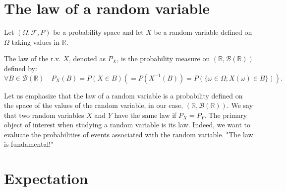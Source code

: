 \section{The law of a random variable}%
Let $(\Omega, \mathcal{F}, P)$ be a probability space and let $X$ be a random variable defined on $\Omega$ taking values in $\mathbb{R}$.%

\begin{definition}
The law of the r.v. $X$, denoted as $P_X$, is the probability measure on $(\mathbb{R}, \mathcal{B}(\mathbb{R}))$ defined by:
\[ \forall B \in \mathcal{B}(\mathbb{R}) \quad P_X(B) = P(X \in B) (= P(X^{-1}(B)) = P(\{\omega \in \Omega; X(\omega) \in B\})). \]
\end{definition}
Let us emphasize that the law of a random variable is a probability defined on the space of the values of the random variable, in our case, $(\mathbb{R}, \mathcal{B}(\mathbb{R}))$.
We say that two random variables $X$ and $Y$ have the same law if $P_X = P_Y$.
The primary object of interest when studying a random variable is its law. Indeed, we want to evaluate the probabilities of events associated with the random variable.
"The law is fundamental!"%
\section{Expectation}%

